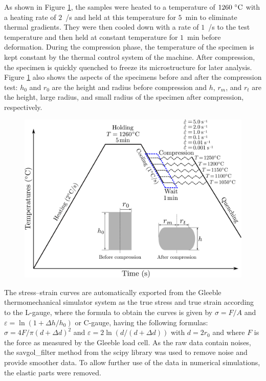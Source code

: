 \documentclass[metals,article,accept,pdftex,moreauthors]{Definitions/mdpi}
\begin{document}
As shown in Figure \ref{fig:GleebleProcess}, the samples were heated to a temperature of $1260~\celsius$ with a heating rate of $2$~\celsius/s and held at this temperature for $5$~min to eliminate thermal gradients.
They were then cooled down with a rate of $1$~\celsius/s to the test temperature and then held at constant temperature for $1$~min before deformation.
During the compression phase, the temperature of the specimen is kept constant by the thermal control system of the machine.
After compression, the specimen is quickly quenched to freeze its microstructure for later analysis.
Figure \ref{fig:GleebleProcess} also shows the aspects of the specimens before and after the compression test: $h_0$ and $r_0$ are the height and radius before compression and $h$, $r_m$, and $r_t$ are the height, large radius, and small radius of the specimen after compression, respectively.
\begin{figure}[H]

\includegraphics[width=0.8\columnwidth]{Figures/GleebleProcess}
\caption{}
\label{fig:GleebleProcess}
\end{figure}

The stress--strain curves are automatically exported from the Gleeble thermomechanical simulator system as the true stress and true strain according to the L-gauge, where the formula to obtain the curves is given by $\sigma=F/A$ and $\varepsilon=\ln\left(1+\Delta h / h_0\right)$ or C-gauge, having the following formulas: $\sigma = 4F/\pi(d+\Delta d)^2$ and $\varepsilon = 2\ln\left(d/(d+\Delta d)\right)$ with $d = 2r_0$ and where $F$ is the force as measured by the Gleeble load cell.
As the raw data contain noises, the savgol\_filter method from the scipy library was used to remove noise and provide smoother data.
To allow further use of the data in numerical simulations, the elastic parts were removed.
\end{document}
